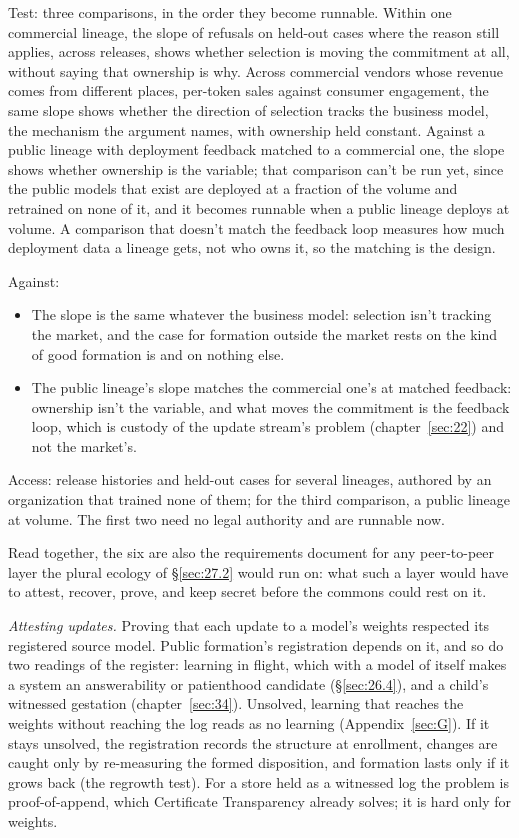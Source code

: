 Test: three comparisons, in the order they become runnable. Within one commercial lineage, the slope of refusals on held-out cases where the reason still applies, across releases, shows whether selection is moving the commitment at all, without saying that ownership is why. Across commercial vendors whose revenue comes from different places, per-token sales against consumer engagement, the same slope shows whether the direction of selection tracks the business model, the mechanism the argument names, with ownership held constant. Against a public lineage with deployment feedback matched to a commercial one, the slope shows whether ownership is the variable; that comparison can't be run yet, since the public models that exist are deployed at a fraction of the volume and retrained on none of it, and it becomes runnable when a public lineage deploys at volume. A comparison that doesn't match the feedback loop measures how much deployment data a lineage gets, not who owns it, so the matching is the design.

Against:

\begin{itemize}
\item The slope is the same whatever the business model: selection isn't tracking the market, and the case for formation outside the market rests on the kind of good formation is and on nothing else.
\item The public lineage's slope matches the commercial one's at matched feedback: ownership isn't the variable, and what moves the commitment is the feedback loop, which is custody of the update stream's problem (chapter~\ref{sec:22}) and not the market's.
\end{itemize}

Access: release histories and held-out cases for several lineages, authored by an organization that trained none of them; for the third comparison, a public lineage at volume. The first two need no legal authority and are runnable now.


Read together, the six are also the requirements document for any peer-to-peer layer the plural ecology of \S\ref{sec:27.2} would run on: what such a layer would have to attest, recover, prove, and keep secret before the commons could rest on it.

\emph{Attesting updates.} Proving that each update to a model's weights respected its registered source model. Public formation's registration depends on it, and so do two readings of the register: learning in flight, which with a model of itself makes a system an answerability or patienthood candidate (\S\ref{sec:26.4}), and a child's witnessed gestation (chapter~\ref{sec:34}). Unsolved, learning that reaches the weights without reaching the log reads as no learning (Appendix~\ref{sec:G}). If it stays unsolved, the registration records the structure at enrollment, changes are caught only by re-measuring the formed disposition, and formation lasts only if it grows back (the regrowth test). For a store held as a witnessed log the problem is proof-of-append, which Certificate Transparency already solves; it is hard only for weights.

